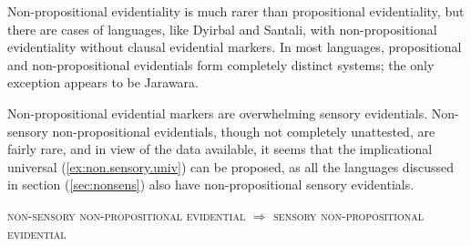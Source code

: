 \documentclass[oneside,a4paper,11pt]{article}
\begin{document}
Non-propositional evidentiality is much rarer than propositional evidentiality, but there are cases of languages, like Dyirbal and Santali, with non-propositional evidentiality without clausal evidential markers. In most languages, propositional and non-propositional evidentials form completely distinct systems; the only exception appears to be Jarawara. 



Non-propositional evidential markers are overwhelming sensory evidentials.  Non-sensory non-propositional evidentials, though not completely unattested, are fairly rare, and  in view of the data available, it seems that the implicational universal (\ref{ex:non.sensory.univ}) can be proposed, as all the languages discussed in section (\ref{sec:nonsens}) also have non-propositional sensory evidentials.

\begin{exe}
\ex \label{ex:non.sensory.univ}
\glt \textsc{non-sensory non-propositional evidential} $\Rightarrow$ \textsc{sensory non-propositional evidential}
\end{exe}



\end{document}
